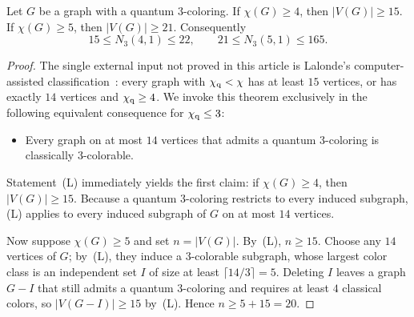 \begin{proposition}\label{prop:order-lower}
Let $G$ be a graph with a quantum $3$-coloring. If $\chi(G)\ge4$, then $|V(G)|\ge15$. If $\chi(G)\ge5$, then $|V(G)|\ge21$. Consequently
\[
 15\le N_3(4,1)\le22,\qquad 21\le N_3(5,1)\le165.
\]
\end{proposition}
\begin{proof}
The single external input not proved in this article is Lalonde's computer-assisted classification~\cite[Theorem~1.1 of the arXiv version]{La}: every graph with $\chi_{\mathrm q}<\chi$ has at least $15$ vertices, or has exactly $14$ vertices and $\chi_{\mathrm q}\ge4$. We invoke this theorem exclusively in the following equivalent consequence for $\chi_{\mathrm q}\le3$:
\begin{itemize}
\item[\textup{(L)}] Every graph on at most $14$ vertices that admits a quantum $3$-coloring is classically $3$-colorable.
\end{itemize}
Statement~(L) immediately yields the first claim: if $\chi(G)\ge4$, then $|V(G)|\ge15$. Because a quantum $3$-coloring restricts to every induced subgraph, (L) applies to every induced subgraph of $G$ on at most $14$ vertices.

Now suppose $\chi(G)\ge5$ and set $n=|V(G)|$. By~(L), $n\ge15$. Choose any $14$ vertices of $G$; by~(L), they induce a $3$-colorable subgraph, whose largest color class is an independent set $I$ of size at least $\lceil14/3\rceil=5$. Deleting $I$ leaves a graph $G-I$ that still admits a quantum $3$-coloring and requires at least $4$ classical colors, so $|V(G-I)|\ge15$ by~(L). Hence $n\ge 5+15=20$.


\end{proof}
